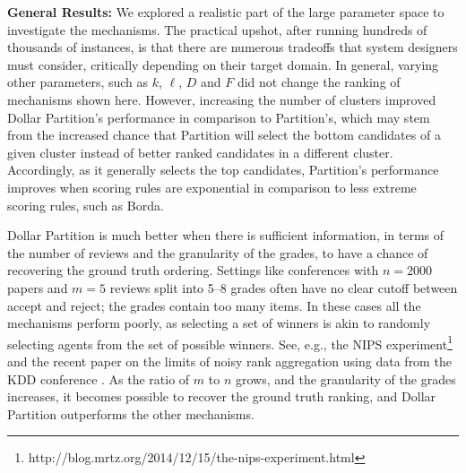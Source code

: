 \documentclass[letterpaper]{article}
\begin{document}

\smallskip
\noindent
\textbf{General Results:} We explored a realistic part of the large parameter space to investigate the mechanisms. The practical upshot, after running hundreds of thousands of instances, is that there are numerous tradeoffs that system designers must consider, critically depending on their target domain. In general, varying other parameters, such as $k$, $\ell$, $D$ and $F$ did not change the ranking of mechanisms shown here. However, increasing the number of clusters improved Dollar Partition's performance in comparison to Partition's, which may stem from the increased chance that Partition will select the bottom candidates of a given cluster instead of better ranked candidates in a different cluster. Accordingly, as it generally selects the top candidates, Partition's performance improves when scoring rules are exponential in comparison to less extreme scoring rules, such as Borda. 

Dollar Partition is much better when there is sufficient information, in terms of the number of reviews and the granularity of the grades, to have a chance of recovering the ground truth ordering. Settings like conferences with $n=2000$ papers and $m=5$ reviews split into 5--8 grades often have no clear cutoff between accept and reject; the grades contain too many items. In these cases all the mechanisms perform poorly, as selecting a set of winners is akin to randomly selecting agents from the set of possible winners. See, e.g., the NIPS experiment\footnote{http://blog.mrtz.org/2014/12/15/the-nips-experiment.html} and the recent paper on the limits of noisy rank aggregation using data from the KDD conference \cite{JoRa15a}. As the ratio of $m$ to $n$ grows, and the granularity of the grades increases, it becomes possible to recover the ground truth ranking, and Dollar Partition outperforms the other mechanisms.
\end{document}
